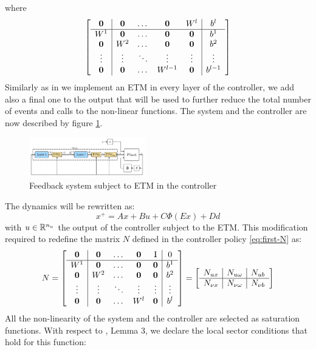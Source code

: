 \documentclass{article}
\begin{document}
where
\begin{equation}\label{eq:first-N}
  \left[\begin{matrix}
    \begin{array}{c | c c c c | c}
      \operatorname{\mathbf{0}} & \operatorname{\mathbf{0}} & \dots & \operatorname{\mathbf{0}} & W^l & b^l \\ 
      \hline
      W^1 & \operatorname{\mathbf{0}} & \dots & \operatorname{\mathbf{0}} & \operatorname{\mathbf{0}} & b^1 \\
      \operatorname{\mathbf{0}} & W^2 & \dots & \operatorname{\mathbf{0}} & \operatorname{\mathbf{0}} & b^2 \\
      \vdots & \vdots & \ddots & \vdots & \vdots & \vdots \\
      \operatorname{\mathbf{0}} & \operatorname{\mathbf{0}} & \dots & W^{l-1} & \operatorname{\mathbf{0}} & b^{l-1}
    \end{array}
  \end{matrix}\right]
\end{equation}
Similarly as in \cite{css-extended} we implement an ETM in every layer of the controller, we add also a final one to the output that will be used to further reduce the total number of events and calls to the non-linear functions. The system and the controller are now described by figure \ref{fig:second_scheme}.
\begin{figure}[H]
    \centering
    \includegraphics[width=0.45\textwidth]{Figures/second_scheme}
    \centering
    \caption{Feedback system subject to ETM in the controller}
    \label{fig:second_scheme}
\end{figure}
The dynamics will be rewritten as:
\begin{equation}\label{eq:system-dynamics}
  x^{+} = A x + B u + C \Phi(E x) + D d
\end{equation}
with $u \in {\mathbb{R}}^{n_u}$ the output of the controller subject to the ETM. This modification required to redefine the matrix $N$ defined in the controller policy \ref{eq:first-N} as:
\begin{equation}\label{eq:last-N}
  N = \left[\begin{matrix}
    \begin{array}{c | c c c c | c}
      \operatorname{\mathbf{0}} & \operatorname{\mathbf{0}} & \dots & \operatorname{\mathbf{0}} & \operatorname{I} & 0 \\ 
      \hline
      W^1 & \operatorname{\mathbf{0}} & \dots & \operatorname{\mathbf{0}} & \operatorname{\mathbf{0}} & b^1 \\
      \operatorname{\mathbf{0}} & W^2 & \dots & \operatorname{\mathbf{0}} & \operatorname{\mathbf{0}} & b^2 \\
      \vdots & \vdots & \ddots & \vdots & \vdots & \vdots \\
      \operatorname{\mathbf{0}} & \operatorname{\mathbf{0}} & \dots & W^l & \operatorname{\mathbf{0}} & b^l
    \end{array}
  \end{matrix}\right] = \left[\begin{matrix}
    \begin{array}{c | c | c}
    N_{u x} & N_{u \omega} & N_{u b} \\
    \hline
    N_{\nu x} & N_{\nu \omega} & N_{\nu b}
    \end{array} 
  \end{matrix}\right]
\end{equation}
All the non-linearity of the system and the controller are selected as saturation functions. With respect to \cite{css-extended}, Lemma 3, we declare the local sector conditions that hold for this function:
\end{document}
